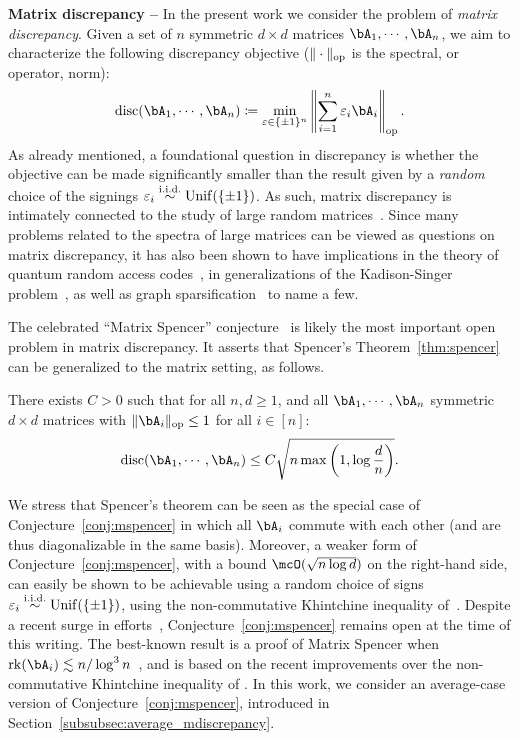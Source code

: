 \myskip 
\textbf{Matrix discrepancy --}
In the present work we consider the problem of \emph{matrix discrepancy}. Given a set of $n$ symmetric $d \times d$ matrices $\bA_1, \cdots, \bA_n$, 
we aim to characterize the following discrepancy objective ($\|\cdot\|_{\mathrm{op}}$ is the spectral, or operator, norm):
\begin{equation}
    \label{eq:def_disc}
    \disc(\bA_1, \cdots, \bA_n) \coloneqq \min_{\eps \in \{\pm 1\}^n} \left\| \sum_{i=1}^n \eps_i \bA_i \right\|_\op.
\end{equation}
As already mentioned, a foundational question in discrepancy is whether the objective can be made significantly smaller than the result given by a \emph{random} choice of the 
signings $\varepsilon_i \overset{\mathrm{i.i.d.}}{\sim} \mathrm{Unif}(\{\pm 1\})$. As such, matrix discrepancy is intimately connected to the study of large random matrices~\citep{bandeira2023matrix}. 
Since many problems related to the spectra of large matrices can be viewed as questions on matrix discrepancy, 
it has also
been shown to have implications in the theory of quantum random access codes~\citep{hopkins2022matrix,bansal2023resolving}, 
in generalizations of the Kadison-Singer problem~\citep{marcus2015interlacing,kyng2020four}, as well as 
graph sparsification~\citep{batson2014twice} to name a few.

\myskip
The celebrated ``Matrix Spencer'' conjecture~\citep{zouzias2012matrix,meka2014discrepancy1} is likely the most important open problem in matrix discrepancy.
It asserts that Spencer's Theorem~\ref{thm:spencer} can be generalized to the matrix setting, as follows.
\begin{conjecture}\label{conj:mspencer}
    There exists $C > 0$ such that for all $n, d \geq 1$, and all $\bA_1, \cdots, \bA_n$ symmetric $d \times d$ matrices with $\|\bA_i\|_\op \leq 1$ for all $i \in [n]$:
    \begin{equation*}
        \disc(\bA_1, \cdots, \bA_n) \leq C \sqrt{n \max\left(1, \log \frac{d}{n}\right)}.
    \end{equation*}
\end{conjecture}
\noindent
We stress that Spencer's theorem can be seen as the special case of Conjecture~\ref{conj:mspencer} in which all $\bA_i$ commute with each other (and are thus diagonalizable in the same basis).
Moreover, a weaker form of Conjecture~\ref{conj:mspencer}, with a bound $\mcO(\sqrt{n \log d})$ on the right-hand side, can easily be shown to be achievable using a random choice 
of signs $\varepsilon_i \overset{\mathrm{i.i.d.}}{\sim} \mathrm{Unif}(\{\pm 1\})$, using the non-commutative Khintchine inequality of~\cite{lust1991non}.
Despite a recent surge in efforts~\citep{hopkins2022matrix,dadush2022new}, Conjecture~\ref{conj:mspencer} remains open at the time of this writing. 
The best-known result is a proof of Matrix Spencer when
$\rk(\bA_i) \lesssim n / \log^3 n$~\citep{bansal2023resolving}, and is based on the recent improvements over the non-commutative Khintchine inequality of \cite{bandeira2023matrix}.
In this work, we consider an average-case version of Conjecture~\ref{conj:mspencer}, introduced in Section~\ref{subsubsec:average_mdiscrepancy}.

